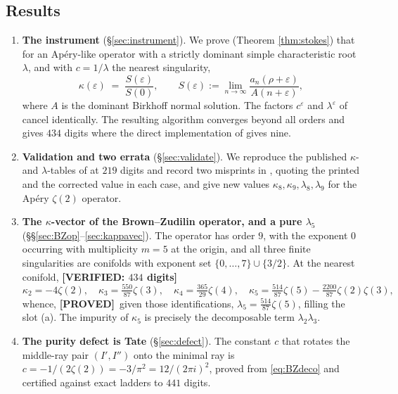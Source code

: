\documentclass[11pt,reqno]{amsart}
\theoremstyle{plain}
\theoremstyle{definition}
\theoremstyle{remark}
\newcommand{\PROVED}{{\normalfont\sffamily\bfseries[PROVED]}}
\newcommand{\VER}[1]{{\normalfont\sffamily\bfseries[VERIFIED: #1]}}
\newcommand{\eps}{\varepsilon}
\begin{document}
\subsection{Results}
\begin{enumerate}[label=\textbf{(\arabic*)},leftmargin=2.6em]

\item \textbf{The instrument} (\S\ref{sec:instrument}). We prove (Theorem \ref{thm:stokes})
that for an Ap\'ery-like operator with a strictly dominant simple characteristic root
$\lambda$, and with $c=1/\lambda$ the nearest singularity,
\[
  \kappa(\eps)\;=\;\frac{S(\eps)}{S(0)},\qquad
  S(\eps):=\lim_{n\to\infty}\frac{a_n(\rho+\eps)}{A(n+\eps)},
\]
where $A$ is the dominant Birkhoff normal solution. The factors $c^{\eps}$ and $\lambda^{\eps}$
of \cite[Lemma 24]{BV} cancel identically. The resulting algorithm converges beyond all orders
and gives $434$ digits where the direct implementation of \cite[Lemma 24]{BV} gives nine.

\item \textbf{Validation and two errata} (\S\ref{sec:validate}). We reproduce the published
$\kappa$- and $\lambda$-tables of \cite{GZ1,GZ2,BV,RV} at $219$ digits and record two misprints
in \cite{BV}, quoting the printed and the corrected value in each case, and give new values
$\kappa_8,\kappa_9,\lambda_8,\lambda_9$ for the Ap\'ery $\zeta(2)$ operator.

\item \textbf{The $\kappa$-vector of the Brown--Zudilin operator, and a pure $\lambda_5$}
(\S\S\ref{sec:BZop}--\ref{sec:kappavec}). The operator has order $9$, with the exponent $0$
occurring with multiplicity $m=5$ at the origin, and all three finite singularities are
conifolds with exponent set $\{0,\dots,7\}\cup\{3/2\}$. At the nearest conifold,
\VER{$434$ digits}
\[
  \kappa_2=-4\zeta(2),\quad \kappa_3=\tfrac{550}{87}\zeta(3),\quad
  \kappa_4=\tfrac{365}{29}\zeta(4),\quad
  \kappa_5=\tfrac{514}{87}\zeta(5)-\tfrac{2200}{87}\zeta(2)\zeta(3),
\]
whence, \PROVED\ given those identifications, $\lambda_5=\tfrac{514}{87}\zeta(5)$, filling the
slot (a). The impurity of $\kappa_5$ is precisely the decomposable term $\lambda_2\lambda_3$.

\item \textbf{The purity defect is Tate} (\S\ref{sec:defect}). The constant $c$ that rotates the
middle-ray pair $(I',I'')$ onto the minimal ray is
$c=-1/(2\zeta(2))=-3/\pi^2=12/(2\pi i)^2$, proved from \eqref{eq:BZdeco} and certified against
exact ladders to $441$ digits.


\end{enumerate}
\end{document}
